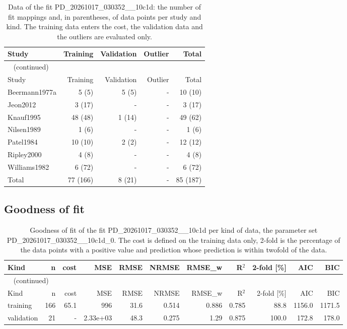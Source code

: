 \documentclass{article}
\begin{document}
\begin{longtable}{lrrrr}
\caption{Data of the fit PD\_20261017\_030352\_\_10c1d: the number of fit mappings and, in parentheses, of data points per study and kind. The training data enters the cost, the validation data and the outliers are evaluated only.}\label{tab:data:PD_20261017_030352__10c1d} \\
\toprule
Study & Training & Validation & Outlier & Total \\
\midrule
\endfirsthead
\multicolumn{5}{l}{\small\tablename~\thetable{} (continued)} \\
\toprule
Study & Training & Validation & Outlier & Total \\
\midrule
\endhead
\bottomrule
\endlastfoot
Beermann1977a & 5 (5) & 5 (5) & - & 10 (10) \\
Jeon2012 & 3 (17) & - & - & 3 (17) \\
Knauf1995 & 48 (48) & 1 (14) & - & 49 (62) \\
Nilsen1989 & 1 (6) & - & - & 1 (6) \\
Patel1984 & 10 (10) & 2 (2) & - & 12 (12) \\
Ripley2000 & 4 (8) & - & - & 4 (8) \\
Williams1982 & 6 (72) & - & - & 6 (72) \\
Total & 77 (166) & 8 (21) & - & 85 (187) \\
\end{longtable}

\subsection{Goodness of fit}

\begin{longtable}{lrrrrrrrrrr}
\caption{Goodness of fit of the fit PD\_20261017\_030352\_\_10c1d per kind of data, the parameter set PD\_20261017\_030352\_\_10c1d\_0. The cost is defined on the training data only, 2-fold is the percentage of the data points with a positive value and prediction whose prediction is within twofold of the data.}\label{tab:metrics:PD_20261017_030352__10c1d} \\
\toprule
Kind & n & cost & MSE & RMSE & NRMSE & RMSE\_w & R\ensuremath{^{2}} & 2-fold [\%] & AIC & BIC \\
\midrule
\endfirsthead
\multicolumn{11}{l}{\small\tablename~\thetable{} (continued)} \\
\toprule
Kind & n & cost & MSE & RMSE & NRMSE & RMSE\_w & R\ensuremath{^{2}} & 2-fold [\%] & AIC & BIC \\
\midrule
\endhead
\bottomrule
\endlastfoot
training & 166 & 65.1 & 996 & 31.6 & 0.514 & 0.886 & 0.785 & 88.8 & 1156.0 & 1171.5 \\
validation & 21 & - & 2.33e+03 & 48.3 & 0.275 & 1.29 & 0.875 & 100.0 & 172.8 & 178.0 \\
\end{longtable}
\end{document}
